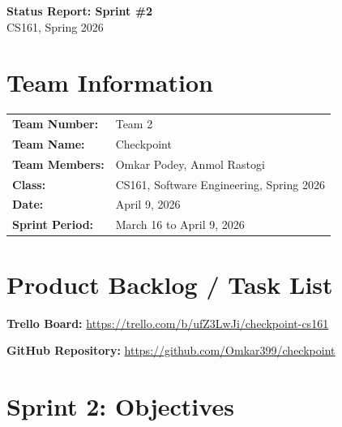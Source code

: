 \documentclass[11pt]{article}
\begin{document}
\begin{center}
    {\LARGE \textbf{Status Report: Sprint \#2}} \\[6pt]
    {\large CS161, Spring 2026}
\end{center}

\vspace{0.5em}

\section{Team Information}

\begin{tabularx}{\textwidth}{@{}lX@{}}
    \textbf{Team Number:}          & Team 2 \\
    \textbf{Team Name:}            & Checkpoint \\
    \textbf{Team Members:}         & Omkar Podey, Anmol Rastogi \\
    \textbf{Class:}                & CS161, Software Engineering, Spring 2026 \\
    \textbf{Date:}                 & April 9, 2026 \\
    \textbf{Sprint Period:}        & March 16 to April 9, 2026 \\
\end{tabularx}

\section{Product Backlog / Task List}

\textbf{Trello Board:} \url{https://trello.com/b/ufZ3LwJi/checkpoint-cs161}

\textbf{GitHub Repository:} \url{https://github.com/Omkar399/checkpoint}

\section{Sprint 2: Objectives}
\end{document}
